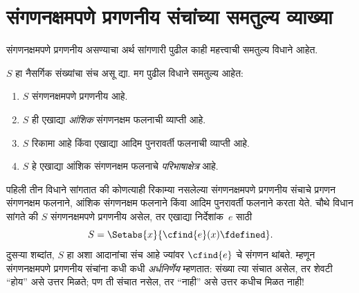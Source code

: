 \section{संगणनक्षमपणे
  प्रगणनीय संचांच्या समतुल्य व्याख्या}\label{cmp:thy:eqc:sec}


संगणनक्षमपणे प्रगणनीय असण्याचा अर्थ सांगणारी पुढील काही महत्त्वाची
समतुल्य विधाने आहेत.

\begin{thm}
\label{cmp:thy:eqc:thm:ce-equiv}
$S$ हा नैसर्गिक संख्यांचा संच असू द्या. मग पुढील विधाने समतुल्य आहेत:
\begin{enumerate}
\item\label{cmp:thy:eqc:case:ce} $S$ संगणनक्षमपणे प्रगणनीय आहे.
\item\label{cmp:thy:eqc:case:ran-pc} $S$ ही एखाद्या \emph{आंशिक}
  संगणनक्षम फलनाची व्याप्ती आहे.
\item\label{cmp:thy:eqc:case:ran-prim} $S$ रिकामा आहे किंवा एखाद्या आदिम
  पुनरावर्ती फलनाची व्याप्ती आहे.
\item\label{cmp:thy:eqc:case:ce-domain} $S$ हे एखाद्या आंशिक संगणनक्षम
  फलनाचे \emph{परिभाषाक्षेत्र} आहे.
\end{enumerate}
\end{thm}

\begin{explain}
पहिली तीन विधाने सांगतात की कोणत्याही रिकाम्या नसलेल्या
संगणनक्षमपणे प्रगणनीय संचाचे प्रगणन संगणनक्षम फलनाने, आंशिक
संगणनक्षम फलनाने किंवा आदिम पुनरावर्ती फलनाने करता येते.
चौथे विधान सांगते की $S$ संगणनक्षमपणे प्रगणनीय असेल, तर
एखाद्या निर्देशांक~$e$ साठी
\[S = \Setabs{x}{\cfind{e}(x) \fdefined}.
\]
दुसऱ्या शब्दांत, $S$ हा अशा आदानांचा संच आहे ज्यांवर
$\cfind{e}$ चे संगणन थांबते. म्हणून संगणनक्षमपणे प्रगणनीय
संचांना कधी कधी \emph{अर्धनिर्णेय} म्हणतात: संख्या त्या संचात
असेल, तर शेवटी ``होय'' असे उत्तर मिळते; पण ती संचात नसेल,
तर ``नाही'' असे उत्तर कधीच मिळत नाही!{}
\end{explain}

